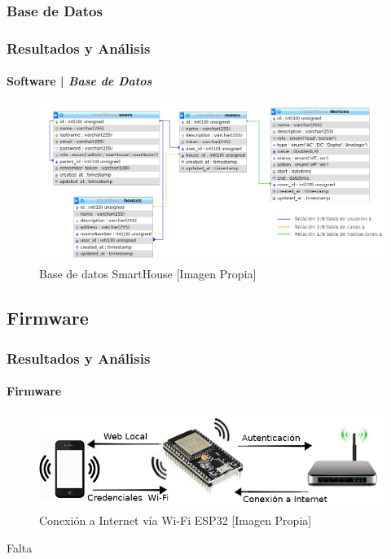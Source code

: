 \subsubsection{Base de Datos}
\begin{frame}
\frametitle{Resultados y Análisis}
\framesubtitle{Software | \emph{Base de Datos}}
\begin{figure}[H]
\centering
\caption{Base de datos SmartHouse [Imagen Propia]}
\label{fig:db}
\includegraphics[width=0.75\linewidth]{Imagenes/DB}
\end{figure}

\end{frame}


\subsection{Firmware}
\begin{frame}
\frametitle{Resultados y Análisis}
\framesubtitle{Firmware}

\begin{figure}
	\centering
	\caption{Conexión a Internet vía Wi-Fi ESP32 [Imagen Propia]}
	\label{fig:conexion}
	\includegraphics[width=\linewidth]{Imagenes/conexion}
\end{figure}
Falta
\end{frame}

